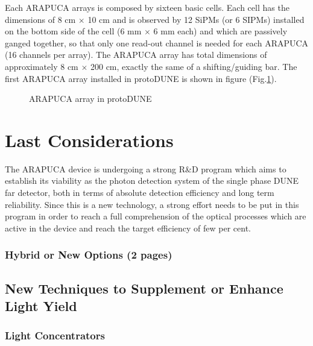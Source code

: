 Each ARAPUCA arrays is composed by sixteen basic cells. Each cell has the dimensions of 8 cm $\times$ 10 cm and is 
observed by 12 SiPMs (or 6 SIPMs) installed on the bottom side of the cell (6 mm $\times$ 6 mm each) and which are passively ganged together, so that only one read-out channel is needed for each 
ARAPUCA (16 channels per array). The ARAPUCA array has total dimensions of approximately 8 cm $\times$ 200 cm, exactly the same of a shifting/guiding bar. The first ARAPUCA array installed in protoDUNE is shown in figure (Fig.\ref{arapuca_array}).
\begin{figure}[ht]
\begin{center}
\caption{ARAPUCA array in protoDUNE} 
\label{arapuca_array}
\end{center}
\end{figure}
\newpage
\section{Last Considerations}

The ARAPUCA device is undergoing a strong R\&D program which aims to establish its 
viability as the photon detection system of the single phase DUNE far detector, both 
in terms of absolute detection efficiency and long term reliability. Since this is a 
new technology, a strong effort needs to be put in this program in order to reach a 
full comprehension of the optical processes which are active in the device and reach 
the target efficiency of few per cent.


\subsubsection{Hybrid or New Options (2 pages)}
\label{ssec:fdsp-pd-pc-new}

\subsection{New Techniques to Supplement or Enhance Light Yield}
\label{sec:fdsp-pd-enh}

\subsubsection{Light Concentrators}
\label{sec:fdsp-pd-assy-lc}
	
